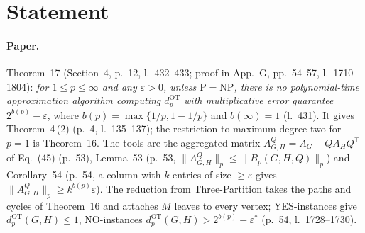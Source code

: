 

\paperversion

\section{Statement}

\paragraph{Paper.} Theorem~17 (Section~4, p.~12, l.~432--433; proof in App.~G, pp.~54--57,
l.~1710--1804): \emph{for $1\le p\le\infty$ and any $\varepsilon>0$, unless $\mathrm{P}=\mathrm{NP}$, there
is no polynomial-time approximation algorithm computing $d^{\mathrm{OT}}_p$ with multiplicative error
guarantee $2^{b(p)}-\varepsilon$}, where $b(p)=\max\{1/p,1-1/p\}$ and $b(\infty)=1$ (l.~431). It gives
Theorem~4\,(2) (p.~4, l.~135--137); the restriction to maximum degree two for $p=1$ is Theorem~16. The tools
are the aggregated matrix $A^Q_{G,H}=A_G-QA_HQ^\top$ of Eq.~(45) (p.~53),
Lemma~53 (p.~53, $\|A^Q_{G,H}\|_p\le\|B_p(G,H,Q)\|_p$) and Corollary~54 (p.~54, a column with $k$ entries
of size $\ge\varepsilon$ gives $\|A^Q_{G,H}\|_p\ge k^{b(p)}\varepsilon$). The reduction from Three-Partition
takes the paths and cycles of Theorem~16 and attaches $M$ leaves to every vertex; YES-instances give
$d^{\mathrm{OT}}_p(G,H)\le1$, NO-instances $d^{\mathrm{OT}}_p(G,H)>2^{b(p)}-\varepsilon^*$ (p.~54, l.~1728--1730).


